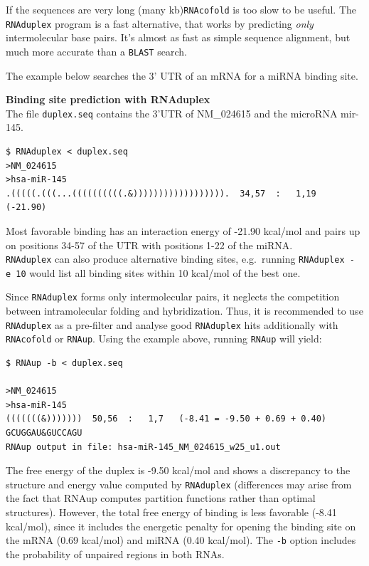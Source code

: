 \documentclass[]{article}
\begin{document}
If the sequences are very long (many kb)\texttt{RNAcofold} is too slow
to be useful. The \texttt{RNAduplex} program is a fast alternative, that
works by predicting \emph{only} intermolecular base pairs. It's almost
as fast as simple sequence alignment, but much more accurate than a
\texttt{BLAST} search.

The example below searches the 3' UTR of an mRNA for a miRNA binding
site.

\textbf{Binding site prediction with RNAduplex}\\
 The file \texttt{duplex.seq} contains the 3'UTR of NM\_024615 and the
microRNA mir-145.

\begin{verbatim}
$ RNAduplex < duplex.seq
>NM_024615
>hsa-miR-145
.(((((.(((...((((((((((.&)))))))))))))))))).  34,57  :   1,19  (-21.90)
\end{verbatim}

Most favorable binding has an interaction energy of -21.90 kcal/mol and
pairs up on positions 34-57 of the UTR with positions 1-22 of the
miRNA.\\
 \texttt{RNAduplex} can also produce alternative binding sites,
e.g.~running \texttt{RNAduplex\ -e\ 10} would list all binding sites
within 10 kcal/mol of the best one.

Since \texttt{RNAduplex} forms only intermolecular pairs, it neglects
the competition between intramolecular folding and hybridization. Thus,
it is recommended to use \texttt{RNAduplex} as a pre-filter and analyse
good \texttt{RNAduplex} hits additionally with \texttt{RNAcofold} or
\texttt{RNAup}. Using the example above, running \texttt{RNAup} will
yield:

\begin{verbatim}
$ RNAup -b < duplex.seq

>NM_024615
>hsa-miR-145
(((((((&)))))))  50,56  :   1,7   (-8.41 = -9.50 + 0.69 + 0.40)
GCUGGAU&GUCCAGU
RNAup output in file: hsa-miR-145_NM_024615_w25_u1.out
\end{verbatim}

The free energy of the duplex is -9.50 kcal/mol and shows a discrepancy
to the structure and energy value computed by \texttt{RNAduplex}
(differences may arise from the fact that RNAup computes partition
functions rather than optimal structures). However, the total free
energy of binding is less favorable (-8.41 kcal/mol), since it includes
the energetic penalty for opening the binding site on the mRNA (0.69
kcal/mol) and miRNA (0.40 kcal/mol). The \texttt{-b} option includes the
probability of unpaired regions in both RNAs.
\end{document}
